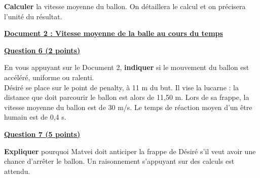 \documentclass[12pt,a4paper]{article}
\newcommand{\question}[1]{\par\medskip\noindent\underline{\textbf{#1}}\par\smallskip}
\newcommand{\pts}[1]{\textbf{(#1 points)}}
\begin{document}
\vspace{0.4cm}

\noindent
\textbf{Calculer} la vitesse moyenne du ballon. On détaillera le calcul et on précisera l'unité du résultat.

\vspace{0.4cm}

\question{Document 2 : Vitesse moyenne de la balle au cours du temps}


\question{Question 6 \pts{2}}

\vspace{0.4cm}

\noindent
En vous appuyant sur le Document 2, \textbf{indiquer} si le mouvement du ballon est accéléré, uniforme ou ralenti.\\[0.4cm]
Désiré se place sur le point de penalty, à 11 m du but. Il vise la lucarne : la distance que doit parcourir le ballon est alors de 11,50 m. Lors de sa frappe, la vitesse moyenne du ballon est de 30 m/s. Le temps de réaction moyen d'un être humain est de 0,4 s.

\vspace{0.4cm}

\question{Question 7 \pts{5}}

\vspace{0.4cm}

\noindent
\textbf{Expliquer} pourquoi Matvei doit anticiper la frappe de Désiré s'il veut avoir une chance d'arrêter le ballon. Un raisonnement s’appuyant sur des calculs est attendu.
\end{document}
